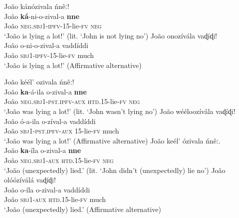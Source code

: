 \documentclass[output=paper,colorlinks=true, citecolor=brown,draftmode]{langscibook}
\begin{document}
{\ea\label{ex:cuw:93}
    \ea\label{ex:cuw:93a} João kánózivala ńnêː! \\ 
        \gll  João \textbf{ká}{}-ni-o-zival-a \textbf{nne} \\
               João \textsc{neg.sbj1-ipfv-15}{}-lie\textsc{{}-fv} \textsc{neg} \\
        \glt  ‘João is lying a lot!’ (lit. ‘John is not lying no’)
    \ex\label{ex:cuw:93b} João onozívála vaɖíɖi! \\
        \gll João o-ni-o-zival-a vaddíddi \\
            João \textsc{sbj1-ipfv-15}-lie-\textsc{fv} much \\
        \glt ‘João is lying a lot!’ (Affirmative alternative)
    \z
\z
}

\ea\label{ex:cuw:94}
     \ea\label{ex:cuw:94a} João kéél’ ozivala ńnêː!  \\
        \gll  João \textbf{ka}{}-á-ila o-zival-a \textbf{nne}  \\
               João \textsc{neg.sbj1-pst.ipfv-aux} \textsc{htd.15}{}-lie\textsc{{}-fv} \textsc{neg} \\
        \glt  ‘João was lying a lot!’ (lit. ‘John wasn’t lying no’)
    \ex\label{ex:cuw:94b} João wééloozívâla vaɖíɖi! \\
        \gll João ó-a-ila o-zíval-a vaddíddi \\
            João \textsc{sbj1-pst.ipfv-aux} 15-lie-\textsc{fv} much \\
        \glt ‘João was lying a lot!’ (Affirmative alternative)
    \z
\z
\newpage
{\ea\label{ex:cuw:95}
  \ea\label{ex:cuw:95a}João keél’ ózivala ńnêː. \\
        \gll  João \textbf{ka}{}-íla o-zival-a \textbf{nne} \\
            João \textsc{neg.sbj1-aux} \textsc{htd.15-}lie-\textsc{fv} \textsc{neg} \\
        \glt  `João (unexpectedly) lied.’ (lit. ‘John didn’t (unexpectedly) lie no’)
    \ex\label{ex:cuw:95b} João olóózíválá vaɖíɖi! \\
        \gll João o-íla o-zival-a vaddíddi \\
            João \textsc{sbj1-aux} \textsc{htd}.15-lie-\textsc{fv} much \\
        \glt `João (unexpectedly) lied.’ (Affirmative alternative)
    \z
\z }
\end{document}
